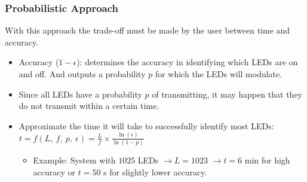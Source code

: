 \documentclass{beamer}
\begin{document}
	\begin{frame}\frametitle{Probabilistic Approach}

		With this approach the trade-off must be made by the user between time and accuracy.

		\begin{itemize}

			\item Accuracy ($1 - \epsilon$): determines the accuracy in identifying which LEDs are on and off. And outputs a probability $p$ for which the LEDs will modulate.

			\item Since all LEDs have a probability $p$ of transmitting, it may happen that they do not transmit within a certain time.


			\item Approximate the time it will take to successfully identify most LEDs: $t = f(L,\ f,\ p,\ \epsilon) = \frac{L}{f} \times \frac{\ln(\epsilon)}{\ln(1 - p)}$

			\begin{itemize}
				\item Example: System with $1025$ LEDs $\rightarrow L = 1023$ $\rightarrow t = 6$ min for high accuracy or $t = 50$ s for slightly lower accuracy.
			\end{itemize}

		\end{itemize}
		
	\end{frame}
\end{document}
